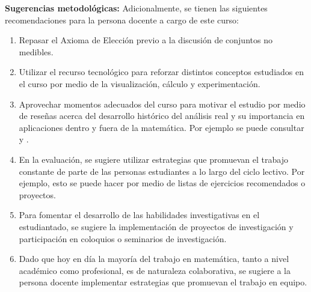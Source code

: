 \begin{refsection}
\textbf{Sugerencias metodológicas:} Adicionalmente, se tienen las siguientes recomendaciones para la persona docente a cargo de este curso:
\begin{enumerate}
    \item Repasar el Axioma de Elección previo a la discusión de conjuntos no medibles.
    \item Utilizar el recurso tecnológico para reforzar distintos conceptos estudiados en el curso por medio de la visualización, cálculo y experimentación.
    \item Aprovechar momentos adecuados del curso para motivar el estudio por medio de reseñas acerca del desarrollo histórico del análisis real y su importancia en aplicaciones dentro y fuera de la matemática. Por ejemplo se puede consultar \cite{Fol16} y \cite{Bre08}.
    \item En la evaluación, se sugiere utilizar estrategias que promuevan el trabajo constante de parte de las personas estudiantes a lo largo del ciclo lectivo. Por ejemplo, esto se puede hacer por medio de listas de ejercicios recomendados o proyectos.
    \item Para fomentar el desarrollo de las habilidades investigativas en el estudiantado, se sugiere la implementación de proyectos de investigación y participación en coloquios o seminarios de investigación.
    \item Dado que hoy en día la mayoría del trabajo en matemática, tanto a nivel académico como profesional, es de naturaleza colaborativa, se sugiere a la persona docente implementar estrategias que promuevan el trabajo en equipo.
\end{enumerate}



\nocite{Apo76}
\nocite{Lie01}
\nocite{RF10}
\nocite{Roy88}
\nocite{WZ15}
\nocite{SS05}
\nocite{Hei19}
\nocite{BBT08}
\nocite{Bre08}
\nocite{Fol99}




\printbibliography[heading=subbibliography,section=\the\value{refsection}]
\end{refsection}
